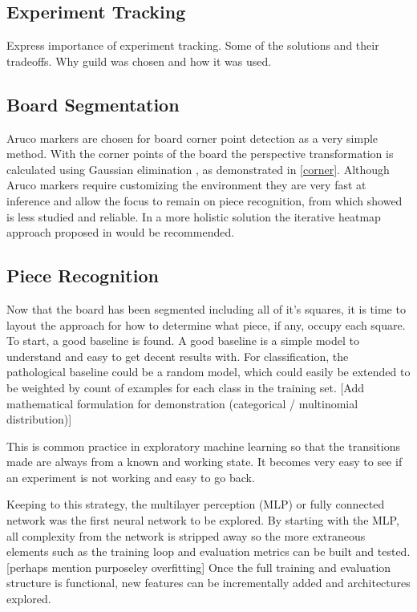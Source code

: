 \subsection{Experiment Tracking}
Express importance of experiment tracking.  Some of the solutions \cite{} and their tradeoffs.
Why guild was chosen and how it was used.

\subsection{Board Segmentation}
Aruco markers are chosen for board corner point detection as a very simple method.
With the corner points of the board the perspective transformation is calculated using
Gaussian elimination \cite{gauss}, as demonstrated in \autoref{corner}.
Although Aruco markers require customizing the environment they are very fast at 
inference and allow the focus to remain on piece recognition, from which
 showed is less studied and reliable.  In a more holistic solution the 
iterative heatmap approach proposed in \cite{heatmap} would be recommended.

\subsection{Piece Recognition}
Now that the board has been segmented including all of it's squares, it is time to layout the approach for how
to determine what piece, if any, occupy each square.  To start, a good baseline is found.  
A good baseline is a simple model to understand and easy to get decent results with.
For classification, the pathological baseline could be a random model, which could easily be extended to be weighted by 
count of examples for each class in the training set.  [Add mathematical formulation for demonstration (categorical / multinomial distribution)]

This is common practice in exploratory machine learning \cite{} so that the transitions
made are always from a known and working state.  It becomes very easy to see if an experiment is not working and easy to go back.

Keeping to this strategy, the multilayer perception (MLP) or fully connected network \cite{} was the first neural network to be explored.
By starting with the MLP, all complexity from the network is stripped away so the more extraneous elements such as the training loop and 
evaluation metrics can be built and tested.  [perhaps mention purposeley overfitting]
Once the full training and evaluation structure is functional, new features can be incrementally added and architectures explored.

